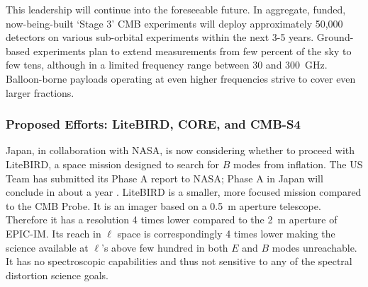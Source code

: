 This leadership will continue into the foreseeable future. In aggregate, funded, now-being-built `Stage 3' 
CMB experiments will deploy approximately 50,000  detectors on various sub-orbital 
experiments within the next 3-5 years. 
Ground-based experiments plan to extend measurements from few percent of the sky to few tens, 
although in a limited frequency range between 30 and 300~GHz. Balloon-borne 
payloads operating at even higher frequencies strive to cover even larger fractions.  



\vspace{-0.18in}

\subsubsection{Proposed Efforts: LiteBIRD, CORE, and CMB-S4} 

\vspace{-0.05in}

Japan, in collaboration with NASA, is now considering whether to proceed with LiteBIRD, a space mission 
designed to search for $B$ modes from inflation. The US Team has submitted its Phase A report to NASA; Phase A 
in Japan will conclude in about a year . LiteBIRD is a smaller, more focused
mission compared to the CMB Probe. It is an imager based on a 0.5~m aperture 
telescope. Therefore it has a resolution 4 times lower compared to the 2~m aperture of EPIC-IM. Its
reach in $\ell$ space is correspondingly 4 times lower making the science available at $\ell$'s above 
few hundred in both $E$ and $B$ modes unreachable. 
It has no spectroscopic capabilities and thus not sensitive to any of the spectral distortion science goals. 

